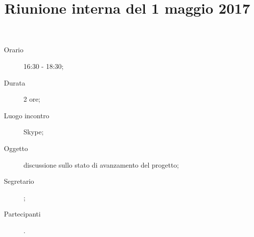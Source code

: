


\author{\GG}
\supervisor{\LB}
\dest{\ALL}
\title{Riunione interna del 1 maggio 2017}



\maketitle

\begin{description}
	\item[Orario] 16:30 - 18:30;
	\item[Durata] 2 ore;
	\item[Luogo incontro] Skype;
	\item[Oggetto] discussione sullo stato di avanzamento del progetto;
	\item[Segretario] \GG;
	\item[Partecipanti] \ALL.
\end{description}

